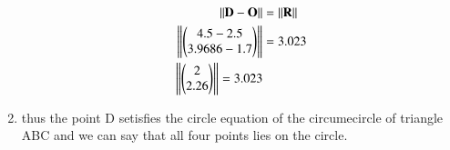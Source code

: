 \begin{enumerate}[label=\thesection.\arabic*.,ref=\thesection.\theenumi]
\begin{align}
\norm{\vec{D} - \vec{O}}   &=  \norm{\vec{R}}
\\
\norm{\myvec{4.5 - 2.5 \\3.9686 -1.7}} &= 3.023
\\
\newline
\norm{\myvec{2\\2.26}} = 3.023
\end{align}

\item thus the point D setisfies the  circle equation of the circumecircle of triangle ABC and we can say that all four points lies on the circle.




\end{enumerate}
